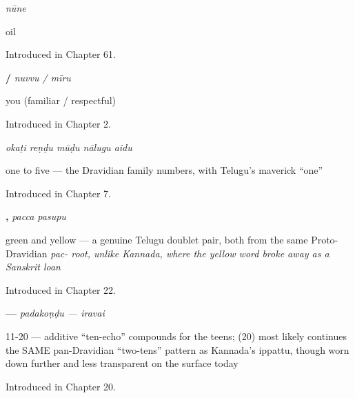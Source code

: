 \noindent\begin{minipage}[t]{\linewidth}
\raggedright
\textbf{}\enspace\emph{nūne}\par
\small oil\par
\footnotesize Introduced in Chapter 61.
\end{minipage}\par\medskip

\noindent\begin{minipage}[t]{\linewidth}
\raggedright
\textbf{ / }\enspace\emph{nuvvu / mīru}\par
\small you (familiar / respectful)\par
\footnotesize Introduced in Chapter 2.
\end{minipage}\par\medskip

\noindent\begin{minipage}[t]{\linewidth}
\raggedright
\textbf{    }\enspace\emph{okaṭi reṇḍu mūḍu nālugu aidu}\par
\small one to five — the Dravidian family numbers, with Telugu's maverick \textquotedblleft{}one\textquotedblright{}\par
\footnotesize Introduced in Chapter 7.
\end{minipage}\par\medskip

\noindent\begin{minipage}[t]{\linewidth}
\raggedright
\textbf{, }\enspace\emph{pacca pasupu}\par
\small green and yellow — a genuine Telugu doublet pair, both from the same Proto-Dravidian \emph{pac- root, unlike Kannada, where the yellow word broke away as a Sanskrit loan}\par
\footnotesize Introduced in Chapter 22.
\end{minipage}\par\medskip

\noindent\begin{minipage}[t]{\linewidth}
\raggedright
\textbf{ — }\enspace\emph{padakoṇḍu — iravai}\par
\small 11-20 — additive \textquotedblleft{}ten-echo\textquotedblright{} compounds for the teens;  (20) most likely continues the SAME pan-Dravidian \textquotedblleft{}two-tens\textquotedblright{} pattern as Kannada's ippattu, though worn down further and less transparent on the surface today\par
\footnotesize Introduced in Chapter 20.
\end{minipage}\par\medskip

